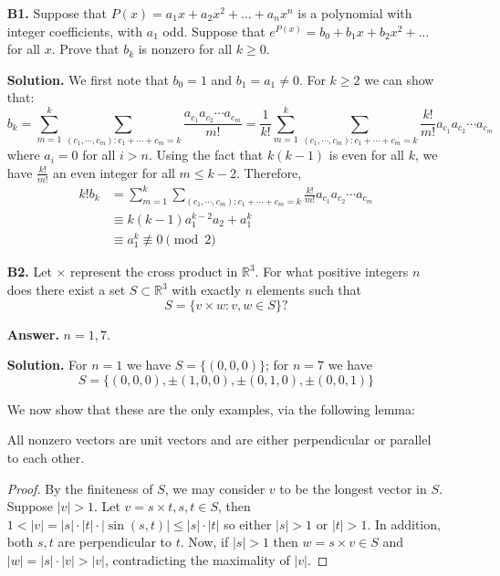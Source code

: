 \documentclass[11pt,a4paper]{article}
\begin{document}
	\begin{enumerate}
		\item [\textbf{B1.}]
		Suppose that $P(x)=a_1x+a_2x^2+\ldots+a_nx^n$ is a polynomial with integer coefficients, with $a_1$ odd. Suppose that $e^{P(x)}=b_0+b_1x+b_2x^2+\ldots$ for all $x.$ Prove that $b_k$ is nonzero for all $k \geq 0.$
		
		\textbf{Solution.} 
		We first note that $b_0 = 1$ and $b_1 = a_1\neq 0$. For $k\ge 2$ we can show that:
		\begin{equation}
		b_k = \sum_{m=1}^k \sum_{(c_1, \cdots, c_m): c_1 + \cdots + c_m = k} \frac{a_{c_1}a_{c_2}\cdots a_{c_m}}{m!}
		=\frac{1}{k!}\sum_{m=1}^k \sum_{(c_1, \cdots, c_m): c_1 + \cdots + c_m = k}\frac{k!}{m!}a_{c_1}a_{c_2}\cdots a_{c_m}
		\end{equation}
		where $a_i = 0$ for all $i > n$. 
		Using the fact that $k(k - 1)$ is even for all $k$, we have $\frac{k!}{m!}$ an even integer for all $m\le k-2$. 
		Therefore, 
		\begin{align}
		k!b_k
		&=\sum_{m=1}^k \sum_{(c_1, \cdots, c_m): c_1 + \cdots + c_m = k}\frac{k!}{m!}a_{c_1}a_{c_2}\cdots a_{c_m}
		\nonumber\\
		&\equiv k(k - 1)a_1^{k-2}a_2 + a_1^k
		\nonumber\\
		&\equiv a_1^k
		\not\equiv 0\pmod{2}
		\end{align}
		
		\item [\textbf{B2.}]
		Let $\times$ represent the cross product in $\mathbb{R}^3.$ For what positive integers $n$ does there exist a set $S \subset \mathbb{R}^3$ with exactly $n$ elements such that$$S=\{v \times w: v, w \in S\}?$$
		
		\textbf{Answer.} $n=1, 7$. 
		
		\textbf{Solution.} 
		For $n=1$ we have $S=\{(0, 0, 0)\}$; 
		for $n=7$ we have $$S=\{(0, 0, 0), \pm(1, 0, 0), \pm(0, 1, 0), \pm(0, 0, 1)\}$$
		
		We now show that these are the only examples, via the following lemma: 
		\begin{lemma}
			  All nonzero vectors are unit vectors and are either perpendicular or parallel to each other. 
		\end{lemma}
	    
	    \begin{proof}
	    	  By the finiteness of $S$, we may consider $v$ to be the longest vector in $S$. 
	    	  Suppose $|v| > 1$. 
	    	  Let $v  = s\times t, s, t\in S$, then $1 < |v| = |s|\cdot |t|\cdot |\sin (s, t)|\le |s|\cdot |t|$ so either 
	    	  $|s| > 1$ or $|t| > 1$. 
	    	  In addition, both $s, t$ are perpendicular to $t$. 
	    	  Now, if $|s| > 1$ then $w = s\times v\in S$ and $|w| = |s| \cdot |v| > |v|$, 
	    	  contradicting the maximality of $|v|$. 
	    	  

\end{proof}
\end{enumerate}
\end{document}
